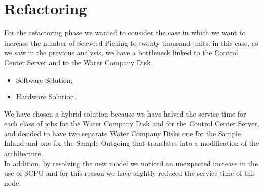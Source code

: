 \section{Refactoring}

For the refactoring phase we wanted to consider the case in which we want to increase the number of Seaweed Picking to twenty thousand units. in this case, as we saw in the previous analysis, we have a bottleneck linked to the Control Center Server and to the Water Company Disk.

\begin{itemize}
	\item Software Solution;
	\item Hardware Solution.
\end{itemize}

We have chosen a hybrid solution because we have halved the service time for each class of jobs for the Water Company Disk and for the Control Center Server, and decided to have two separate Water Company Disks one for the Sample Inland and one for the Sample Outgoing that translates into a modification of the architecture.\\
In addition, by resolving the new model we noticed an unexpected increase in the use of SCPU and for this reason we have slightly reduced the service time of this node.